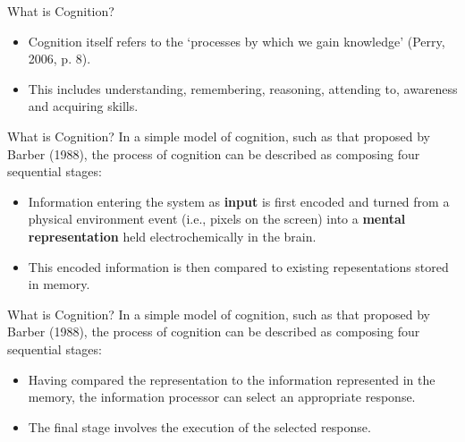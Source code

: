 \begin{frame}{What is Cognition?}
	\begin{itemize}
		\item Cognition itself refers to the `processes by which we gain knowledge' (Perry, 2006, p. 8).
		
		\vspace{2ex}
		
		\item This includes understanding, remembering, reasoning, attending to, awareness and acquiring skills.
	\end{itemize}
\end{frame}

\begin{frame}{What is Cognition?}
	In a simple model of cognition, such as that proposed by Barber (1988), the process of cognition can be described as composing four sequential
	stages: 
	
	\vspace{2ex}

	\begin{itemize}
		\item Information entering the system as \textbf{input} is first encoded and turned from a physical environment event (i.e., pixels on the screen) 
		into a \textbf{mental representation} held electrochemically in the brain.
		
		\vspace{2ex}
		
		\item This encoded information is then compared to existing repesentations stored in memory.
	\end{itemize}
\end{frame}

\begin{frame}{What is Cognition?}
	In a simple model of cognition, such as that proposed by Barber (1988), the process of cognition can be described as composing four sequential
	stages: 
	
	\vspace{2ex}

	\begin{itemize}
		\item Having compared the representation to the information represented in the memory, the information processor can select an appropriate response.
		
		\vspace{2ex}
		
		\item The final stage involves the execution of the selected response.
	\end{itemize}
\end{frame}

